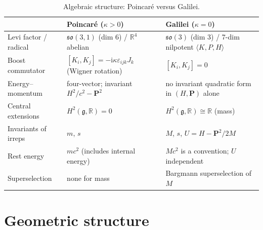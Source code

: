 \documentclass[11pt,a4paper]{article}
\newcommand{\ii}{\mathrm{i}}
\newcommand{\eps}{\varepsilon}
\newcommand{\R}{\mathbb{R}}
\newcommand{\bP}{\mathbf{P}}
\theoremstyle{plain}
\theoremstyle{definition}
\theoremstyle{remark}
\begin{document}
\begin{table}[ht]
\centering
\renewcommand{\arraystretch}{1.25}
\begin{tabular}{@{}>{\raggedright\arraybackslash}p{3.2cm}>{\raggedright\arraybackslash}p{5.6cm}>{\raggedright\arraybackslash}p{5.6cm}@{}}
\toprule
 & Poincar\'e ($\kappa>0$) & Galilei ($\kappa=0$) \\
\midrule
Levi factor / radical & $\mathfrak{so}(3,1)$ (dim 6) / $\R^4$ abelian & $\mathfrak{so}(3)$ (dim 3) / 7-dim nilpotent $\langle K,P,H\rangle$ \\
Boost commutator & $[K_i,K_j]=-\ii\kappa\eps_{ijk}J_k$ (Wigner rotation) & $[K_i,K_j]=0$ \\
Energy--momentum & four-vector; invariant $H^2/c^2-\bP^2$ & no invariant quadratic form in $(H,\bP)$ alone \\
Central extensions & $H^2(\mathfrak g,\R)=0$ & $H^2(\mathfrak g,\R)\cong\R$ (mass) \\
Invariants of irreps & $m$, $s$ & $M$, $s$, $U=H-\bP^2/2M$ \\
Rest energy & $mc^2$ (includes internal energy) & $Mc^2$ is a convention; $U$ independent \\
Superselection & none for mass & Bargmann superselection of $M$ \\
\bottomrule
\end{tabular}
\caption{Algebraic structure: Poincar\'e versus Galilei.}\label{tab:algebra}
\end{table}

\section{Geometric structure}\label{sec:geometry}
\end{document}
